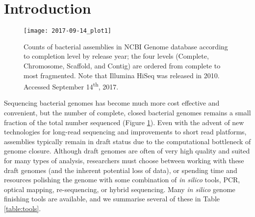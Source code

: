 \documentclass[a4,center,fleqn]{NAR}
\begin{document}
\section{Introduction}
\begin{figure}[!th]
  \centering
  \begin{center}
  \texttt{[image: 2017-09-14\_plot1]}
  \end{center}
  \caption{Counts of bacterial assemblies in NCBI Genome database according to completion level by release year; the four levels (Complete, Chromosome, Scaffold, and Contig) are ordered from complete to most fragmented.  Note that Illumina HiSeq was released in 2010.  Accessed September 14\textsuperscript{th}, 2017.}
  \label{fig:completions}
\end{figure}
Sequencing bacterial genomes has become much more cost effective and convenient, but the number of complete, closed bacterial genomes remains a small fraction of the total number sequenced (Figure \ref{fig:completions}). Even with the advent of new technologies for long-read sequencing and improvements to short read platforms, assemblies typically remain in draft status due to the computational bottleneck of genome closure\cite{Nagarajan2010,Brouwer2016}. Although draft genomes are often of very high quality and suited for many types of analysis, researchers must choose between working with these draft genomes (and the inherent potential loss of data), or spending time and resources polishing the genome with some combination of \textit{in silico} tools, PCR, optical mapping, re-sequencing, or hybrid sequencing\cite{Nagarajan2010,Utturkar2014}. Many \textit{in silico} genome finishing tools are available, and we summarise several of these in Table \ref{table:tools}.

\enlargethispage{-65.1pt}
\end{document}
